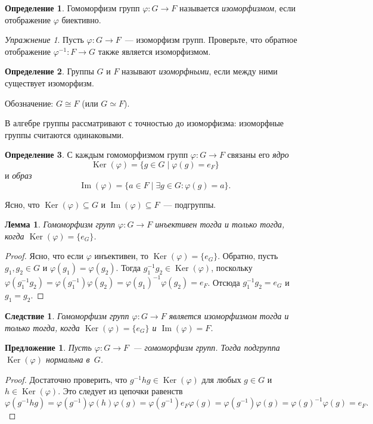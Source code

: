 \documentclass[a4paper,10pt]{amsart}
\newcommand{\Ker}{\mathop{\mathrm{Ker}}}
\renewcommand{\Im}{\mathop{\mathrm{Im}}}
\newtheorem{proposition}{Предложение}
\newtheorem{lemma}{Лемма}
\newtheorem{corollary}{Следствие}
\theoremstyle{definition}
\newtheorem{definition}{Определение}
\theoremstyle{remark}
\newtheorem{exc}{Упражнение}
\begin{document}
\begin{definition}
Гомоморфизм групп $\varphi\colon G\to F$ называется {\it
изоморфизмом}, если отображение $\varphi$ биективно.
\end{definition}

\begin{exc}
Пусть $\varphi\colon G\to F$~--- изоморфизм групп. Проверьте, что
обратное отображение $\varphi^{-1}\colon F \to G$ также является
изоморфизмом.
\end{exc}

\begin{definition}
Группы $G$ и $F$ называют {\it изоморфными}, если между ними
существует изоморфизм.

Обозначение: $G\cong F$ (или $G \simeq F$).
\end{definition}

В алгебре группы рассматривают с точностью до изоморфизма:
изоморфные группы считаются \guillemotleft
одинаковыми\guillemotright{}.

\begin{definition}
С каждым гомоморфизмом групп $\varphi\colon G\to F$ связаны его {\it
ядро}
$$
\Ker(\varphi)=\{g\in G \mid \varphi(g)=e_F\}
$$
и {\it образ}
$$
\Im(\varphi)=\{a\in F \mid \exists g\in G : \varphi(g)=a\}.
$$
\end{definition}

Ясно, что $\Ker(\varphi)\subseteq G$ и $\Im(\varphi)\subseteq F$~---
подгруппы.

\begin{lemma}
Гомоморфизм групп $\varphi \colon G \to F$ инъективен тогда и только
тогда, когда $\Ker(\varphi) = \{e_G\}$.
\end{lemma}
\vspace{-3mm}
\begin{proof}
Ясно, что если $\varphi$ инъективен, то $\Ker(\varphi) = \lbrace e_G
\rbrace$. Обратно, пусть $g_1, g_2 \in G$ и $\varphi(g_1) =
\varphi(g_2)$. Тогда $g_1^{-1} g_2 \in \Ker(\varphi)$, поскольку
$\varphi(g_1^{-1} g_2) = \varphi(g_1^{-1}) \varphi(g_2) =
\varphi(g_1)^{-1} \varphi (g_2) = e_F$. Отсюда $g_1^{-1}g_2 = e_G$ и
$g_1 = g_2$.
\end{proof}

\begin{corollary}
Гомоморфизм групп $\varphi\colon G\to F$ является изоморфизмом тогда
и только тогда, когда $\Ker(\varphi)=\{e_G\}$ и $\Im(\varphi)=F$.
\end{corollary}

\begin{proposition}
Пусть $\varphi \colon G \to F$~--- гомоморфизм групп. Тогда
подгруппа $\Ker(\varphi)$ нормальна в~$G$.
\end{proposition}
\vspace{-3mm}
\begin{proof}
Достаточно проверить, что $g^{-1}hg \in \Ker(\varphi)$ для любых
$g\in G$ и $h \in \Ker(\varphi)$. Это следует из цепочки равенств
$$
\varphi(g^{-1}hg) = \varphi(g^{-1}) \varphi(h) \varphi(g) =
\varphi(g^{-1}) e_F \varphi(g) = \varphi(g^{-1}) \varphi(g) =
\varphi(g)^{-1} \varphi (g) = e_F.
$$
\end{proof}
\end{document}
